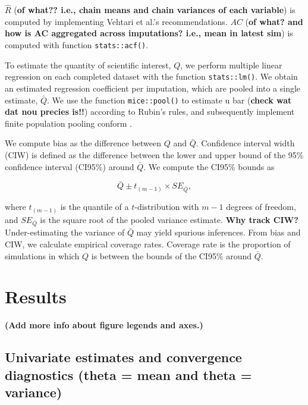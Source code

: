 \documentclass[Royal,times,sageh]{sagej}
\begin{document}
\(\widehat{R}\) (\textbf{of what?? i.e., chain means and chain variances
of each variable}) is computed by implementing Vehtari et al.'s
\citeyearpar{veht19} recommendations. \(AC\) (\textbf{of what? and how
is AC aggregated across imputations? i.e., mean in latest sim}) is
computed with function \texttt{stats::acf()}.

To estimate the quantity of scientific interest, \(Q\), we perform
multiple linear regression on each completed dataset with the function
\texttt{stats::lm()}. We obtain an estimated regression coefficient per
imputation, which are pooled into a single estimate, \(\bar{Q}\). We use
the function \texttt{mice::pool()} to estimate u bar (\textbf{check wat
dat nou precies is!!}) according to Rubin's \citeyearpar{rubin87} rules,
and subsequently implement finite population pooling conform
\citet{vink14}.

We compute bias as the difference between \(Q\) and \(\bar{Q}\).
Confidence interval width (CIW) is defined as the difference between the
lower and upper bound of the 95\% confidence interval (CI95\%) around
\(\bar{Q}\). We compute the CI95\% bounds as

\[\bar{Q} \pm t_{(m-1)} \times SE_{\bar{Q}},\]

where \(t_{(m-1)}\) is the quantile of a \(t\)-distribution with \(m-1\)
degrees of freedom, and \(SE_{\bar{Q}}\) is the square root of the
pooled variance estimate. \textbf{Why track CIW?} Under-estimating the
variance of \(\bar{Q}\) may yield spurious inferences. From bias and
CIW, we calculate empirical coverage rates. Coverage rate is the
proportion of simulations in which \(Q\) is between the bounds of the
CI95\% around \(\bar{Q}\).

\hypertarget{results}{%
\section{Results}\label{results}}

\textbf{(Add more info about figure legends and axes.)}

\hypertarget{univariate-estimates-and-convergence-diagnostics-theta-mean-and-theta-variance}{%
\subsection{Univariate estimates and convergence diagnostics (theta =
mean and theta =
variance)}\label{univariate-estimates-and-convergence-diagnostics-theta-mean-and-theta-variance}}
\end{document}
